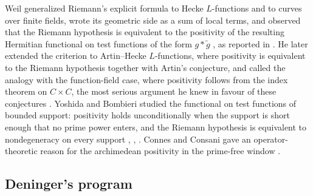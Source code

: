 \documentclass[11pt]{amsart}
\theoremstyle{plain}
\theoremstyle{definition}
\theoremstyle{remark}
\numberwithin{equation}{section}
\begin{document}
Weil generalized Riemann's explicit formula to Hecke $L$-functions and
to curves over finite fields, wrote its geometric side as a sum of
local terms, and observed that the Riemann hypothesis is equivalent to
the positivity of the resulting Hermitian functional on test functions
of the form $g*\tilde g$ \cite{Weil1952Explicit}, as reported in
\cite[\S V, pp.~8--9]{Bombieri2000Clay}. He later extended the
criterion to Artin--Hecke $L$-functions, where positivity is equivalent
to the Riemann hypothesis together with Artin's conjecture, and called
the analogy with the function-field case, where positivity follows from
the index theorem on $C\times C$, the most serious argument he knew in
favour of these conjectures \cite[\S16, p.~16]{Weil1972Explicit}.
Yoshida and Bombieri studied the functional on test functions of
bounded support: positivity holds unconditionally when the support is
short enough that no prime power enters, and the Riemann hypothesis is
equivalent to nondegeneracy on every support
\cite[Proposition~1, p.~285, Theorems~1 and~2, pp.~310 and~321]%
{Yoshida1992Hermitian}, \cite[Theorems~1 and~12, pp.~191 and~226--227]%
{Bombieri2000Lincei}, \cite[Theorem, p.~2]{Burnol2000Explicites}.
Connes and Consani gave an operator-theoretic reason for the archimedean
positivity in the prime-free window
\cite[Theorem~1, p.~3]{ConnesConsani2020WeilPositivity}.

\subsection{Deninger's program}\label{subsec:prior-den}
\end{document}
